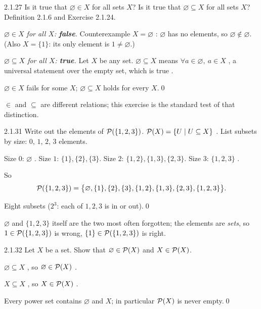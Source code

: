 \begin{bookex}[essential]{2.1.27}
Is it true that $\varnothing\in X$ for all sets $X$? Is it true that $\varnothing\subseteq X$ for all sets $X$?
\solution
\given Definition 2.1.6 and Exercise 2.1.24.
\begin{steps}
\item \emph{$\varnothing\in X$ for all $X$: \textbf{false}.} Counterexample $X=\varnothing$ : $\varnothing$ has no elements, so $\varnothing\notin\varnothing$. (Also $X=\{1\}$: its only element is $1\ne\varnothing$.)
\item \emph{$\varnothing\subseteq X$ for all $X$: \textbf{true}.} Let $X$ be any set. $\varnothing\subseteq X$ means $\forall a\in\varnothing,\ a\in X$ , a universal statement over the empty set, which is true .
\end{steps}
\conclusion $\varnothing\in X$ fails for some $X$; $\varnothing\subseteq X$ holds for every $X$.\qed
\begin{compare}
\item $\in$ and $\subseteq$ are different relations; this exercise is the standard test of that distinction.
\end{compare}
\end{bookex}

\begin{bookex}[essential]{2.1.31}
Write out the elements of $\mathcal{P}(\{1,2,3\})$.
\solution
\given $\mathcal{P}(X)=\{U\mid U\subseteq X\}$ .
\plan List subsets by size: $0$, $1$, $2$, $3$ elements.
\begin{steps}
\item Size $0$: $\varnothing$ . Size $1$: $\{1\},\{2\},\{3\}$. Size $2$: $\{1,2\},\{1,3\},\{2,3\}$. Size $3$: $\{1,2,3\}$ .
\item So
\[
\mathcal{P}(\{1,2,3\})=\big\{\varnothing,\{1\},\{2\},\{3\},\{1,2\},\{1,3\},\{2,3\},\{1,2,3\}\big\}.
\]
\end{steps}
\conclusion Eight subsets ($2^3$: each of $1,2,3$ is in or out).\qed
\begin{compare}
\item $\varnothing$ and $\{1,2,3\}$ itself are the two most often forgotten; the elements are \emph{sets}, so $1\in\mathcal{P}(\{1,2,3\})$ is wrong, $\{1\}\in\mathcal{P}(\{1,2,3\})$ is right.
\end{compare}
\end{bookex}

\begin{bookex}[recommended]{2.1.32}
Let $X$ be a set. Show that $\varnothing\in\mathcal{P}(X)$ and $X\in\mathcal{P}(X)$.
\solution
\begin{steps}
\item $\varnothing\subseteq X$ , so $\varnothing\in\mathcal{P}(X)$ .
\item $X\subseteq X$ , so $X\in\mathcal{P}(X)$ .
\end{steps}
\conclusion Every power set contains $\varnothing$ and $X$; in particular $\mathcal{P}(X)$ is never empty.\qed
\end{bookex}

